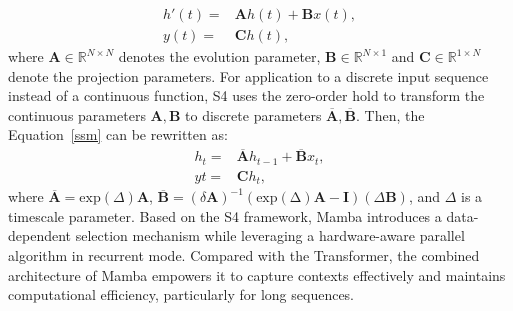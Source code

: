 \begin{equation}
\begin{aligned}
    h'(t) =& \mathbf{A}h(t) + \mathbf{B}x(t),\\
    y(t) =& \mathbf{C}h(t),
\label{ssm}
\end{aligned}
\end{equation}
where $\mathbf{A}\in\mathbb{R}^{N\times N}$ denotes the evolution parameter, $\mathbf{B}\in\mathbb{R}^{N\times 1}$ and $\mathbf{C}\in\mathbb{R}^{1\times N}$ denote the projection parameters. For application to a discrete input sequence instead of a continuous function, S4 uses the zero-order hold to transform the continuous parameters $\mathbf{A},\mathbf{B}$ to discrete parameters $\overline{\mathbf{A}},\overline{\mathbf{B}}$. Then, the Equation~\eqref{ssm} can be rewritten as:
\begin{equation}
\begin{aligned}
    h_t =& \overline{\mathbf{A}}h_{t-1} + \overline{\mathbf{B}}x_t,\\
    yt =& \mathbf{C}h_t,
\end{aligned}
\end{equation}
where $\overline{\mathbf{A}}=\mathrm{exp}(\Delta)\mathbf{A}$, $\overline{\mathbf{B}}=(\delta\mathbf{A})^{-1}(\mathrm{exp(\Delta)\mathbf{A}}-\mathbf{I})(\Delta\mathbf{B})$, and $\Delta$ is a timescale parameter. Based on the S4 framework, Mamba introduces a data-dependent selection mechanism while leveraging a hardware-aware parallel algorithm in recurrent mode. Compared with the Transformer, the combined architecture of Mamba empowers it to capture contexts effectively and maintains computational efficiency, particularly for long sequences.


